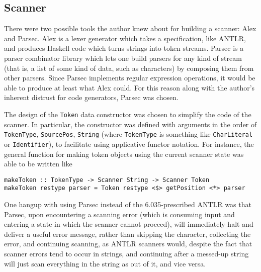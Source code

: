 \documentclass[11pt]{article}
\begin{document}
\subsection{Scanner}
\label{sec:scanner}

There were two possible tools the author knew about for building a
scanner: Alex and Parsec.  Alex is a lexer generator which takes a
specification, like ANTLR, and produces Haskell code which turns
strings into token streams.  Parsec is a parser combinator library
which lets one build parsers for any kind of stream (that is, a list
of some kind of data, such as characters) by composing them from other
parsers.  Since Parsec implements regular expression operations, it
would be able to produce at least what Alex could.  For this reason
along with the author's inherent distrust for code generators, Parsec
was chosen.

The design of the \texttt{Token} data constructor was chosen to
simplify the code of the scanner.  In particular, the constructor was
defined with arguments in the order of \texttt{TokenType},
\texttt{SourcePos}, \texttt{String} (where \texttt{TokenType} is
something like \texttt{CharLiteral} or \texttt{Identifier}), to
facilitate using applicative functor notation.  For instance, the
general function for making token objects using the current scanner
state was able to be written like
\begin{verbatim}
makeToken :: TokenType -> Scanner String -> Scanner Token
makeToken restype parser = Token restype <$> getPosition <*> parser
\end{verbatim} %

One hangup with using Parsec instead of the 6.035-prescribed ANTLR was
that Parsec, upon encountering a scanning error (which is consuming
input and entering a state in which the scanner cannot proceed), will
immediately halt and deliver a useful error message, rather than
skipping the character, collecting the error, and continuing scanning,
as ANTLR scanners would, despite the fact that scanner errors tend to
occur in strings, and continuing after a messed-up string will just
scan everything in the string as out of it, and vice versa.
\end{document}
